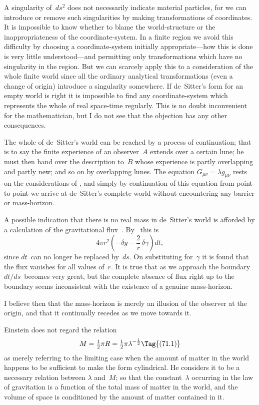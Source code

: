 \documentclass[12pt]{book}
\begin{document}
A singularity of~$ds^{2}$ does not necessarily indicate material particles, for
we can introduce or remove such singularities by making transformations of
coordinates. It is impossible to know whether to blame the world-structure
or the inappropriateness of the coordinate-system. In a finite region we avoid
this difficulty by choosing a coordinate-system initially appropriate---how this
is done is very little understood---and permitting only transformations which
have no singularity in the region. But we can scarcely apply this to a
consideration of the whole finite world since all the ordinary analytical transformations
%
%
(even a change of origin) introduce a singularity somewhere. If
de~Sitter's form for an empty world is right it is impossible to find any
coordinate-system which represents the whole of real space-time regularly.
This is no doubt inconvenient for the mathematician, but I do not see that
the objection has any other consequences.

The whole of de~Sitter's world can be reached by a process of continuation;
that is to say the finite experience of an observer~$A$ extends over a certain
lune; he must then hand over the description to~$B$ whose experience is partly
overlapping and partly new; and so on by overlapping lunes. The equation
$G_{\mu\nu} = \lambda g_{\mu\nu}$ rests on the considerations of , and simply by continuation of
this equation from point to point we arrive at de~Sitter's complete world
without encountering any barrier or mass-horizon.

A possible indication that there is no real mass in de~Sitter's world is
afforded by a calculation of the gravitational flux~. By~ this is
\[
4\pi r^{2} \left(-\delta y - \frac{2}{r}\, \delta\gamma\right) dt,
\]
since $dt$~can no longer be replaced by~$ds$. On substituting for~$\gamma$ it is found
that the flux vanishes for all values of~$r$. It is true that as we approach the
boundary $dt/ds$~becomes very great, but the complete absence of flux right up
to the boundary seems inconsistent with the existence of a genuine mass-horizon.

I believe then that the mass-horizon is merely an illusion of the observer
at the origin, and that it continually recedes as we move towards it.

%

Einstein does not regard the relation~
\[
M = \tfrac{1}{2}\pi R = \tfrac{1}{2}\pi \lambda^{-\frac{1}{2}}
\Tag{(71.1)}
\]
as merely referring to the limiting case when the amount of matter in the
world happens to be sufficient to make the form cylindrical. He considers it
to be a necessary relation between $\lambda$ and~$M$; so that the constant~$\lambda$ occurring
in the law of gravitation is a function of the total mass of matter in the world,
and the volume of space is conditioned by the amount of matter contained
in it.
\end{document}
